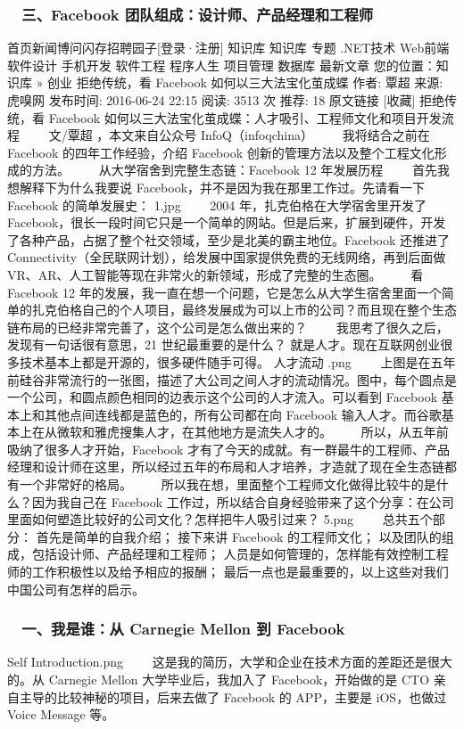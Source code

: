 \documentclass[11pt]{ctexart}
\begin{document}
\subsubsection{　三、Facebook 团队组成：设计师、产品经理和工程师}
\label{sec:orgheadline17}
首页新闻博问闪存招聘园子[登录·注册]
 知识库
知识库 专题 .NET技术 Web前端 软件设计 手机开发 软件工程 程序人生 项目管理 数据库 最新文章
您的位置：知识库 » 创业
拒绝传统，看 Facebook 如何以三大法宝化茧成蝶
作者: 覃超  来源: 虎嗅网  发布时间: 2016-06-24 22:15  阅读: 3513 次  推荐: 18   原文链接   [收藏]
拒绝传统，看 Facebook 如何以三大法宝化茧成蝶：人才吸引、工程师文化和项目开发流程
　　文/覃超 ，本文来自公众号 InfoQ（infoqchina）
　　我将结合之前在 Facebook 的四年工作经验，介绍 Facebook 创新的管理方法以及整个工程文化形成的方法。
　　从大学宿舍到完整生态链：Facebook 12 年发展历程
　　首先我想解释下为什么我要说 Facebook，并不是因为我在那里工作过。先请看一下 Facebook 的简单发展史：
1.jpg
　　2004 年，扎克伯格在大学宿舍里开发了 Facebook，很长一段时间它只是一个简单的网站。但是后来，扩展到硬件，开发了各种产品，占据了整个社交领域，至少是北美的霸主地位。Facebook 还推进了 Connectivity（全民联网计划），给发展中国家提供免费的无线网络，再到后面做 VR、AR、人工智能等现在非常火的新领域，形成了完整的生态圈。
　　看 Facebook 12 年的发展，我一直在想一个问题，它是怎么从大学生宿舍里面一个简单的扎克伯格自己的个人项目，最终发展成为可以上市的公司？而且现在整个生态链布局的已经非常完善了，这个公司是怎么做出来的？
　　我思考了很久之后，发现有一句话很有意思，21 世纪最重要的是什么？ 就是人才。现在互联网创业很多技术基本上都是开源的，很多硬件随手可得。
人才流动 .png
　　上图是在五年前硅谷非常流行的一张图，描述了大公司之间人才的流动情况。图中，每个圆点是一个公司，和圆点颜色相同的边表示这个公司的人才流入。可以看到 Facebook 基本上和其他点间连线都是蓝色的，所有公司都在向 Facebook 输入人才。而谷歌基本上在从微软和雅虎搜集人才，在其他地方是流失人才的。
　　所以，从五年前吸纳了很多人才开始，Facebook 才有了今天的成就。有一群最牛的工程师、产品经理和设计师在这里，所以经过五年的布局和人才培养，才造就了现在全生态链都有一个非常好的格局。
　　所以我在想，里面整个工程师文化做得比较牛的是什么？因为我自己在 Facebook 工作过，所以结合自身经验带来了这个分享：在公司里面如何塑造比较好的公司文化？怎样把牛人吸引过来？
5.png
　　总共五个部分：
首先是简单的自我介绍；
接下来讲 Facebook 的工程师文化；
以及团队的组成，包括设计师、产品经理和工程师；
人员是如何管理的，怎样能有效控制工程师的工作积极性以及给予相应的报酬；
最后一点也是最重要的，以上这些对我们中国公司有怎样的启示。
　

\subsubsection{　一、我是谁：从 Carnegie Mellon 到 Facebook}
\label{sec:orgheadline18}
Self Introduction.png
　　这是我的简历，大学和企业在技术方面的差距还是很大的。从 Carnegie Mellon 大学毕业后，我加入了 Facebook，开始做的是 CTO 亲自主导的比较神秘的项目，后来去做了 Facebook 的 APP，主要是 iOS，也做过 Voice Message 等。
\end{document}
